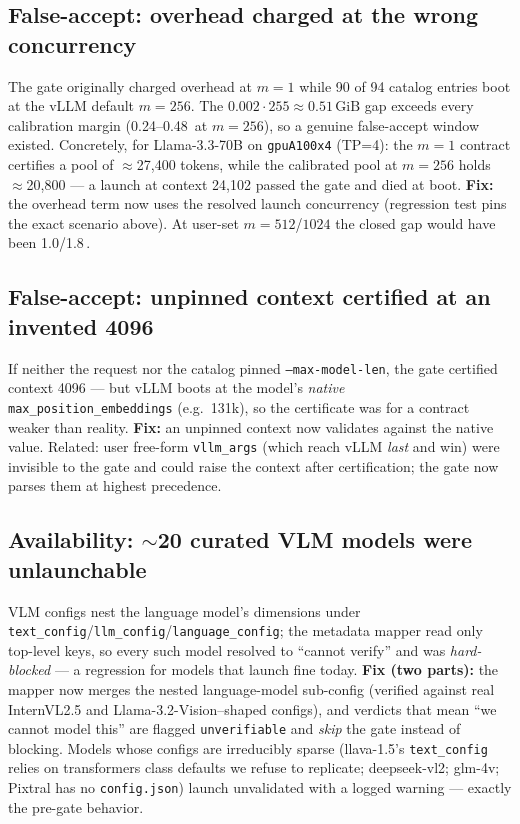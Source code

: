 \documentclass[11pt]{article}
\newcommand{\code}[1]{\texttt{#1}}
\newcommand{\gib}{\,\text{GiB}}
\begin{document}
\subsection{False-accept: overhead charged at the wrong concurrency}

The gate originally charged overhead at $m=1$ while 90 of 94 catalog entries
boot at the vLLM default $m=256$. The $0.002 \cdot 255 \approx 0.51\gib$ gap
exceeds every calibration margin (0.24--0.48\gib{} at $m=256$), so a genuine
false-accept window existed. Concretely, for Llama-3.3-70B on
\code{gpuA100x4} (TP=4): the $m{=}1$ contract certifies a pool of
$\approx$27{,}400 tokens, while the calibrated pool at $m{=}256$ holds
$\approx$20{,}800 --- a launch at context 24{,}102 passed the gate and died at
boot. \textbf{Fix:} the overhead term now uses the resolved launch
concurrency (regression test pins the exact scenario above). At user-set
$m{=}512$/$1024$ the closed gap would have been 1.0/1.8\gib.

\subsection{False-accept: unpinned context certified at an invented 4096}

If neither the request nor the catalog pinned \code{--max-model-len}, the gate
certified context 4096 --- but vLLM boots at the model's \emph{native}
\code{max\_position\_embeddings} (e.g.\ 131k), so the certificate was for a
contract weaker than reality. \textbf{Fix:} an unpinned context now validates
against the native value. Related: user free-form \code{vllm\_args} (which
reach vLLM \emph{last} and win) were invisible to the gate and could raise the
context after certification; the gate now parses them at highest precedence.

\subsection{Availability: $\sim$20 curated VLM models were unlaunchable}

VLM configs nest the language model's dimensions under
\code{text\_config}/\code{llm\_config}/\code{language\_config}; the metadata
mapper read only top-level keys, so every such model resolved to ``cannot
verify'' and was \emph{hard-blocked} --- a regression for models that launch
fine today. \textbf{Fix (two parts):} the mapper now merges the nested
language-model sub-config (verified against real InternVL2.5 and
Llama-3.2-Vision--shaped configs), and verdicts that mean ``we cannot model
this'' are flagged \code{unverifiable} and \emph{skip} the gate instead of
blocking. Models whose configs are irreducibly sparse (llava-1.5's
\code{text\_config} relies on transformers class defaults we refuse to
replicate; deepseek-vl2; glm-4v; Pixtral has no \code{config.json}) launch
unvalidated with a logged warning --- exactly the pre-gate behavior.
\end{document}
